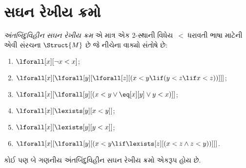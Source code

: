 \begingroup
\makeatletter{}\makeatother

\section{સઘન રેખીય ક્રમો}
\label{guunit:OLP-0190}


\begin{defn}
  \emph{અંતબિંદુવિહીન સઘન રેખીય ક્રમ} એ માત્ર એક 2-સ્થાની
  વિધેય~$<$ ધરાવતી ભાષા માટેની એવી સંરચના
  $\Struct{M}$ છે જે નીચેના વાક્યો સંતોષે છે:
  \begin{enumerate}
  \item $\lforall[x][\lnot x < x]$;
  \item $\lforall[x][\lforall[y][\lforall[z][(x < y \lif (y < z \lif x
    <z ))]]]$;
  \item $\lforall[x][\lforall[y][(x< y \lor \eq[x][y] \lor y < x)]]$;
  \item $\lforall[x][\lexists[y][x < y]]$;
  \item $\lforall[x][\lexists[y][y < x]]$;
  \item $\lforall[x][\lforall[y][(x < y \lif \lexists[z][(x < z \land
        z < y))]]]$.
 \end{enumerate}
\end{defn}

\begin{thm}
  કોઈ પણ બે ગણનીય અંતબિંદુવિહીન સઘન રેખીય ક્રમો એકરૂપ હોય છે.
\end{thm}

